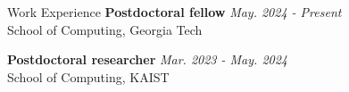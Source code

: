 \begin{rSection}{Work Experience}
\textbf{Postdoctoral fellow} \hfill {\em May. 2024 - Present} \\
  School of Computing, Georgia Tech

\textbf{Postdoctoral researcher} \hfill {\em Mar. 2023 - May. 2024} \\
  School of Computing, KAIST
\end{rSection}


